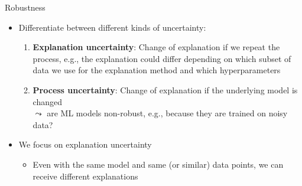 \documentclass[11pt,compress,t,notes=noshow, aspectratio=169, xcolor=table]{beamer}
\begin{document}
\begin{frame}[c]{Robustness}
		\begin{itemize}
		\item Differentiate between different kinds of uncertainty: 
		\begin{enumerate}
			\item \textbf{Explanation uncertainty}: Change of explanation if we repeat the process, e.g., the explanation could differ depending on which subset of data we use for the explanation method and which hyperparameters 
			\pause
			\item \textbf{Process uncertainty}: Change of explanation if the underlying model is changed\\ $\leadsto$ are ML models non-robust, e.g., because they are trained on noisy data?
		\end{enumerate}
		\pause
		\item We focus on explanation uncertainty 
		\begin{itemize}
		    \item Even with the same model and same (or similar) data points, we can receive different explanations
		\end{itemize}
	\end{itemize}
\end{frame}
\end{document}
